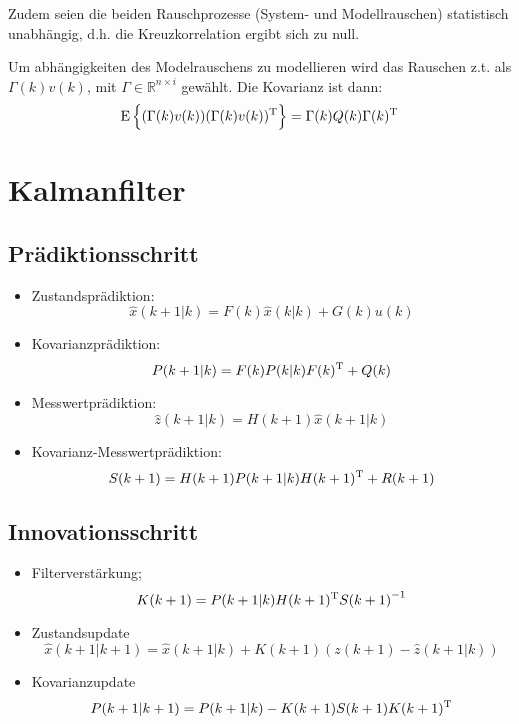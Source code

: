 Zudem seien die beiden Rauschprozesse (System- und Modellrauschen) statistisch unabhängig, d.h.
die Kreuzkorrelation ergibt sich zu null.

Um abhängigkeiten des Modelrauschens zu modellieren wird das Rauschen z.t. als $\Gamma(k) v(k)$, mit
$\Gamma \in \mathbb{R}^{n \times i}$ gewählt. Die Kovarianz ist dann:
\begin{equation*}
    \operatorname*{E}\left\{(\Gamma(k)v(k))(\Gamma(k)v(k))^\text{T}\right\} = \Gamma(k) Q(k) \Gamma(k)^\text{T}
\end{equation*}

\section{Kalmanfilter}
\subsection{Prädiktionsschritt}
\begin{itemize}
    \item Zustandsprädiktion:
        \begin{equation*}
            \hat{x}(k+1|k) = F(k) \hat{x}(k|k) + G(k) u(k)
        \end{equation*} 
    \item Kovarianzprädiktion:
        \begin{equation*}
            P(k+1|k) = F(k)P(k|k)F(k)^\text{T} + Q(k)
        \end{equation*}
    \item Messwertprädiktion:
        \begin{equation*}
            \hat{z}(k+1|k) = H(k+1) \hat{x}(k+1|k)
        \end{equation*}
    \item Kovarianz-Messwertprädiktion:
        \begin{equation*}
            S(k+1) = H(k+1)P(k+1|k)H(k+1)^\text{T} + R(k+1)
        \end{equation*}
\end{itemize}

\subsection{Innovationsschritt}
\begin{itemize}
    \item Filterverstärkung;
        \begin{equation*}
            K(k+1) = P(k+1|k) H(k+1)^\text{T} {S(k+1)}^{-1}
        \end{equation*}
    \item Zustandsupdate
        \begin{equation*}
            \hat{x}(k+1|k+1) = \hat{x}(k+1|k) + K(k+1) (z(k+1) - \hat{z}(k+1|k))
        \end{equation*}
    \item Kovarianzupdate
        \begin{equation*}
            P(k+1|k+1) = P(k+1|k) - K(k+1) S(k+1) K(k+1)^\text{T}
        \end{equation*}
\end{itemize}
